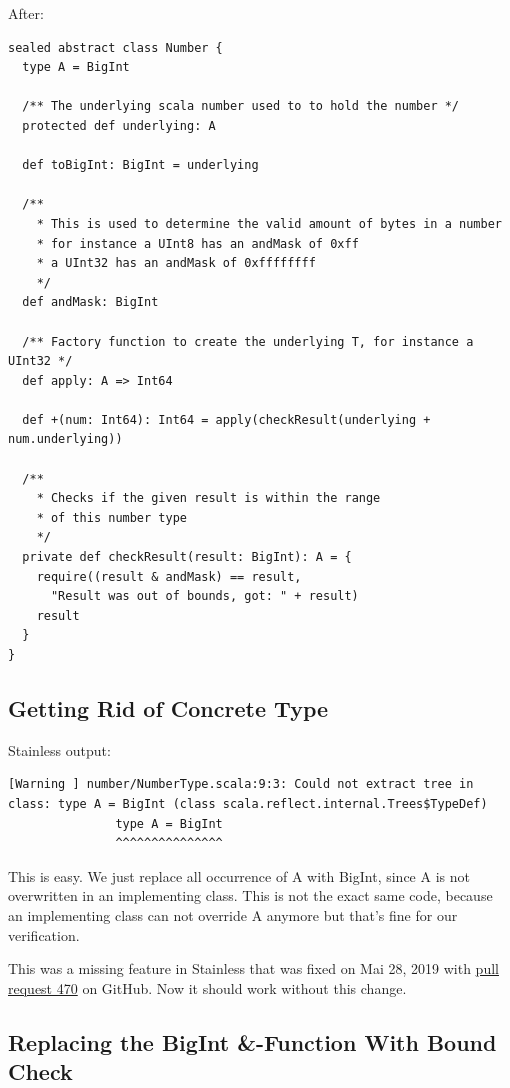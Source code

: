 \documentclass[runningheads]{llncs}
\begin{document}
After:
\begin{lstlisting}[style=scala]
sealed abstract class Number {
  type A = BigInt

  /** The underlying scala number used to to hold the number */
  protected def underlying: A

  def toBigInt: BigInt = underlying

  /**
    * This is used to determine the valid amount of bytes in a number
    * for instance a UInt8 has an andMask of 0xff
    * a UInt32 has an andMask of 0xffffffff
    */
  def andMask: BigInt

  /** Factory function to create the underlying T, for instance a UInt32 */
  def apply: A => Int64

  def +(num: Int64): Int64 = apply(checkResult(underlying + num.underlying))

  /**
    * Checks if the given result is within the range
    * of this number type
    */
  private def checkResult(result: BigInt): A = {
    require((result & andMask) == result,
      "Result was out of bounds, got: " + result)
    result
  }
}
\end{lstlisting}


\subsection{Getting Rid of Concrete Type}

Stainless output:
\begin{lstlisting}[style=stainless]
  [Warning ] number/NumberType.scala:9:3: Could not extract tree in class: type A = BigInt (class scala.reflect.internal.Trees$TypeDef)
               type A = BigInt
               ^^^^^^^^^^^^^^^

\end{lstlisting}

This is easy.
We just replace all occurrence of A with BigInt, since A is not overwritten in an implementing class.
This is not the exact same code, because an implementing class can not override A anymore but that's fine for our verification.

This was a missing feature in Stainless that was fixed on Mai 28, 2019 with \href{https://github.com/epfl-lara/stainless/pull/470}{pull request 470} on GitHub.
Now it should work without this change.


\subsection{Replacing the BigInt \&-Function With Bound Check}
\label{sec:bound_check}
\end{document}
